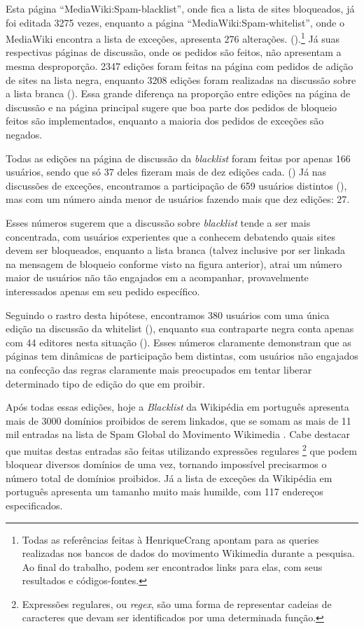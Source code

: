 Esta página ``MediaWiki:Spam-blacklist'', onde fica a lista de sites bloqueados, já foi editada 3275 vezes, enquanto a página ``MediaWiki:Spam-whitelist'', onde o MediaWiki encontra a lista de exceções,  apresenta 276 alterações. (\cite{quarry_edit_mediawiki_namespace}).\footnote{Todas as referências feitas à HenriqueCrang apontam para as queries realizadas nos bancos de dados do movimento Wikimedia durante a pesquisa. Ao final do trabalho, podem ser encontrados links para elas, com seus resultados e códigos-fontes.} Já suas respectivas páginas de discussão, onde os pedidos são feitos, não apresentam a mesma desproporção. 2347 edições foram feitas na página com pedidos de adição de sites na lista negra, enquanto 3208 edições foram realizadas na discussão sobre a lista branca (\cite{quarry_edit_mediawiki_talk_namespace}). Essa grande diferença na proporção entre edições na página de discussão e na página principal sugere que boa parte dos pedidos de bloqueio feitos são implementados, enquanto a maioria dos pedidos de exceções são negados.

Todas as edições na página de discussão da \textit{blacklist} foram feitas por apenas 166 usuários, sendo que só 37 deles fizeram mais de dez edições cada. (\cite{quarry_edit_sbl_talk_page}) Já nas discussões de exceções, encontramos a participação de 659 usuários distintos (\cite{quarry_edit_swl_talk_page}), mas com um número ainda menor de usuários fazendo mais que dez edições: 27.

Esses números sugerem que a discussão sobre \textit{blacklist} tende a ser mais concentrada, com usuários experientes que a conhecem debatendo quais sites devem ser bloqueados, enquanto a lista branca (talvez inclusive por ser linkada na mensagem de bloqueio conforme visto na figura anterior), atrai um número maior de usuários não tão engajados em a acompanhar, provavelmente interessados apenas em seu pedido específico.

Seguindo o rastro desta hipótese, encontramos 380 usuários com uma única edição na discussão da whitelist (\cite{quarry_only_1edit_swl_talk_page}), enquanto sua contraparte negra conta apenas com 44 editores nesta situação (\cite{quarry_only_1edit_sbl_talk_page}). Esses números claramente demonstram que as páginas tem dinâmicas de participação bem distintas, com usuários não engajados na confecção das regras claramente mais preocupados em tentar liberar determinado tipo de edição do que em proibir.

Após todas essas edições, hoje a \textit{Blacklist} da Wikipédia em português apresenta mais de 3000 domínios proibidos de serem linkados, que se somam as mais de 11 mil entradas na lista de Spam Global do Movimento Wikimedia . Cabe destacar que muitas destas entradas são feitas utilizando expressões regulares \footnote{Expressões regulares, ou \textit{regex}, são uma forma de representar cadeias de caracteres que devam ser identificados por uma determinada função.} que podem bloquear diversos domínios de uma vez, tornando impossível precisarmos o número total de domínios proibidos. Já a lista de exceções da Wikipédia em português apresenta um tamanho muito mais humilde, com 117 endereços especificados.

